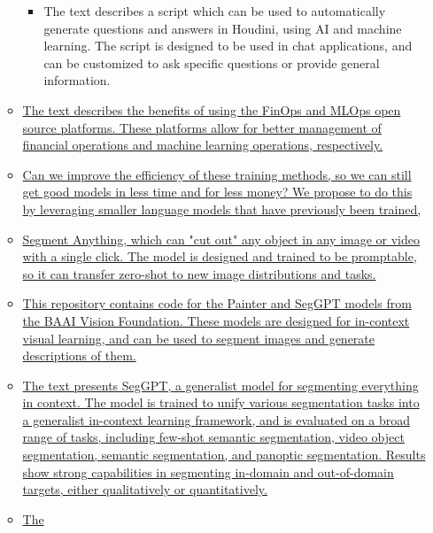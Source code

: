 \begin{itemize}
\begin{itemize}
    \begin{itemize}
     
    \item
      The text describes a script which can be used to automatically
      generate questions and answers in Houdini, using AI and machine
      learning. The script is designed to be used in chat applications,
      and can be customized to ask specific questions or provide general
      information.
    \end{itemize}
  \item
    \href{http://hystax.com}{The text describes the benefits of using
    the FinOps and MLOps open source platforms. These platforms allow
    for better management of financial operations and machine learning
    operations, respectively.}
  \item
    \href{https://gemm.ai/learning-to-grow-machine-learning-models/}{Can
    we improve the efficiency of these training methods, so we can still
    get good models in less time and for less money? We propose to do
    this by leveraging smaller language models that have previously been
    trained,}
  \item
    \href{https://www.linkedin.com/posts/eric-vyacheslav-156273169_big-news-meta-just-released-segment-anything-activity-7049409700370554880-tStk?utm_source=share\&utm_medium=member_android}{Segment
    Anything, which can "cut out" any object in any image or video with
    a single click. The model is designed and trained to be promptable,
    so it can transfer zero-shot to new image distributions and tasks.}
  \item
    \href{http://github.com/baaivision/Painter}{This repository contains
    code for the Painter and SegGPT models from the BAAI Vision
    Foundation. These models are designed for in-context visual
    learning, and can be used to segment images and generate
    descriptions of them.}
  \item
    \href{https://buff.ly/3KD0Zns}{The text presents SegGPT, a
    generalist model for segmenting everything in context. The model is
    trained to unify various segmentation tasks into a generalist
    in-context learning framework, and is evaluated on a broad range of
    tasks, including few-shot semantic segmentation, video object
    segmentation, semantic segmentation, and panoptic segmentation.
    Results show strong capabilities in segmenting in-domain and
    out-of-domain targets, either qualitatively or quantitatively.}
  \item
    \href{https://www.linkedin.com/posts/guohao-li-9a573b136_camel-chatbot-demo-activity-7051390760327225344-8D2A?utm_source=share\&utm_medium=member_android}{The
}
\end{itemize}
\end{itemize}
